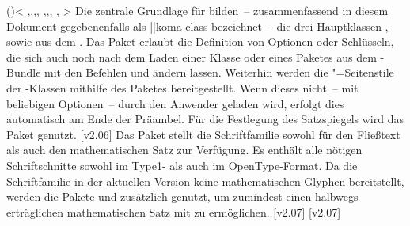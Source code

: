 \begin{DeclarePackages}
\itempkg{}()<%
    ,,,,%
    ,,,%
    ,%
  >%
  Die zentrale Grundlage für \TUDScript bilden~-- zusammenfassend in diesem 
  Dokument gegebenenfalls als \Class||{koma-class} bezeichnet~-- die drei 
  Hauptklassen ,  sowie  aus dem 
  . Das Paket  erlaubt die 
  Definition von Optionen oder Schlüsseln, die sich auch noch nach dem Laden 
  einer Klasse oder eines Paketes aus dem \TUDScript-Bundle mit den Befehlen 
   und  ändern lassen. Weiterhin werden die 
  "=Seitenstile der \TUDScript-Klassen mithilfe des 
  Paketes  bereitgestellt. Wenn dieses nicht~-- mit 
  beliebigen Optionen~-- durch den Anwender geladen wird, erfolgt dies 
  automatisch am Ende der Präambel. Für die Festlegung des Satzspiegels wird
  das Paket  genutzt.
[v2.06]
  Das Paket  stellt die Schriftfamilie \OpenSans sowohl für 
  den Fließtext als auch den mathematischen Satz zur Verfügung. Es enthält alle 
  nötigen Schriftschnitte sowohl im Type1- als auch im OpenType-Format. Da die 
  Schriftfamilie in der aktuellen Version keine mathematischen Glyphen 
  bereitstellt, werden die Pakete  und  
  zusätzlich genutzt, um zumindest einen halbwegs erträglichen mathematischen 
  Satz mit \OpenSans zu ermöglichen.
  [v2.07]
  [v2.07]

\end{DeclarePackages}
